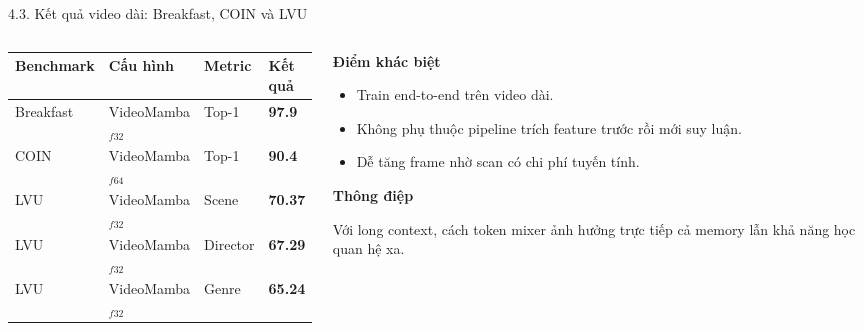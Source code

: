 \documentclass[aspectratio=169,9pt]{beamer}
\newcommand{\source}[1]{}
\newcommand{\heading}[1]{{\bfseries\color{PTITRed} #1\par}}
\newcommand{\tightitems}{\setlength{\itemsep}{0.13em}\setlength{\parskip}{0pt}\setlength{\parsep}{0pt}}
\begin{document}
\begin{frame}{4.3. Kết quả video dài: Breakfast, COIN và LVU}
  \vspace{0.10cm}
  \begin{columns}[T,onlytextwidth]
    \begin{column}{0.56\textwidth}
      \begin{tcolorbox}[titlepanel,title=Kết quả long-term video understanding,height=4.65cm]
        {\fontsize{8.1}{9.2}\selectfont
        \renewcommand{\arraystretch}{1.37}
        \begin{tabularx}{\linewidth}{@{}L{1.55cm}Y C{1.25cm} C{1.25cm}@{}}
          \toprule
          \textbf{Benchmark} & \textbf{Cấu hình} & \textbf{Metric} & \textbf{Kết quả}\\
          \midrule
          Breakfast & VideoMamba$_{f32}$ & Top-1 & \textbf{97.9}\\
          COIN & VideoMamba$_{f64}$ & Top-1 & \textbf{90.4}\\
          LVU & VideoMamba$_{f32}$ & Scene & \textbf{70.37}\\
          LVU & VideoMamba$_{f32}$ & Director & \textbf{67.29}\\
          LVU & VideoMamba$_{f32}$ & Genre & \textbf{65.24}\\
          \bottomrule
        \end{tabularx}}
      \end{tcolorbox}
    \end{column}
    \begin{column}{0.40\textwidth}
      \begin{tcolorbox}[panel,height=2.70cm]
        \heading{Điểm khác biệt}
        \begin{itemize}\tightitems
          \item Train end-to-end trên video dài.
          \item Không phụ thuộc pipeline trích feature trước rồi mới suy luận.
          \item Dễ tăng frame nhờ scan có chi phí tuyến tính.
        \end{itemize}
      \end{tcolorbox}
      \vspace{0.14cm}
      \begin{tcolorbox}[keypanel,height=1.81cm]
        \heading{Thông điệp}
        Với long context, cách token mixer ảnh hưởng trực tiếp cả memory lẫn khả năng học quan hệ xa.
      \end{tcolorbox}
    \end{column}
  \end{columns}
  \vfill
  \source{Nguồn: VideoMamba, Tables 6--7 và Section 4.3.}
\end{frame}
\end{document}
